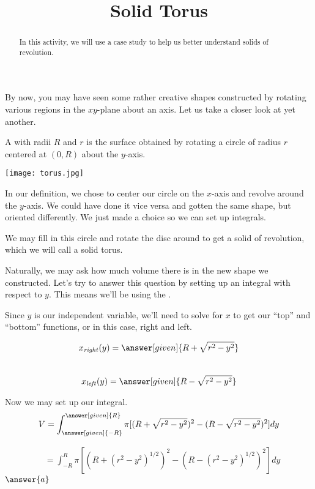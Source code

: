 \documentclass{ximera}
\title{Solid Torus}
\begin{document}
\begin{abstract}
In this activity, we will use a case study to help us better understand solids of revolution.
\end{abstract}
\maketitle

By now, you may have seen some rather creative shapes constructed by rotating various regions in the $xy$-plane about an axis. Let us take a closer look at yet another.
\begin{definition}
	A  with radii $R$ and $r$ is the surface obtained by rotating a circle of radius $r$ centered at $(0,R)$ about the $y$-axis.
\end{definition}

\begin{image}
	\label{torus}
	\texttt{[image: torus.jpg]}
\end{image}

\begin{remark}
	In our definition, we chose to center our circle on the $x$-axis and revolve around the $y$-axis. We could have done it vice versa and gotten the same shape, but oriented differently. We just made a choice so we can set up integrals.
\end{remark} 

We may fill in this circle and rotate the disc around to get a solid of revolution, which we will call a solid torus.

\begin{exercise}
	Naturally, we may ask how much volume there is in the new shape we constructed. Let's try to answer this question by setting up an integral with respect to $y$. This means we'll be using the  .
	
	Since $y$ is our independent variable, we'll need to solve for $x$ to get our ``top'' and ``bottom'' functions, or in this case, right and left.
	
	$$x_{\mathit{right}}(y) = \answer[given]{R+\sqrt{r^2-y^2}}$$ \\
	$$x_{\mathit{left}}(y) = \answer[given]{R-\sqrt{r^2-y^2}}$$
	
	Now we may set up our integral.
	\begin{align*}
		V  &= \int_{\answer[given]{-R}}^{\answer[given]{R}} \pi [ (R+\sqrt{r^2-y^2})^{2}-(R-\sqrt{r^2-y^2})^{2}] dy \\
	\end{align*}
	\begin{exercise}
		\begin{align*}
			&= \int_{-R}^{R} \pi [ (R+(r^2-y^2)^{1/2})^{2}-(R-(r^2-y^2)^{1/2})^{2}] dy
		\end{align*}
		$\answer{a}$
	\end{exercise}
\end{exercise}
\end{document}
